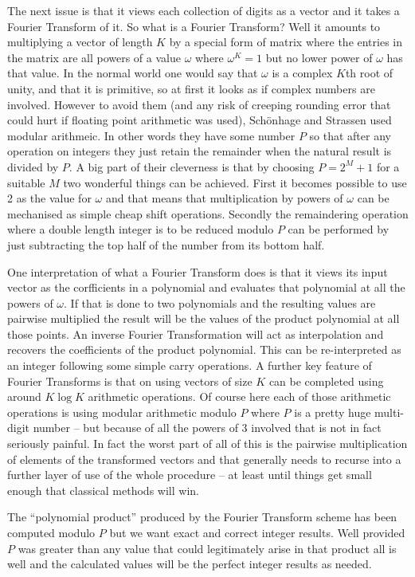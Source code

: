 The next issue is that it views each collection of digits as a vector
and it takes a Fourier Transform of it. So what is a Fourier Transform?
Well it amounts to multiplying a vector of length $K$ by a special form
of matrix where the entries in the matrix are all powers of a value $\omega$
where $\omega^{K} = 1$ but no lower power of $\omega$ has that value. In
the normal world one would say that $\omega$ is a complex $K$th root of unity,
and that it is primitive, so at first it looks as if complex numbers are
involved. However to avoid them (and any risk of creeping rounding error
that could hurt if floating point arithmetic was used), Sch\"{o}nhage and
Strassen used modular arithmeic. In other words they have some number $P$
so that after any operation on integers they just retain the remainder
when the natural result is divided by $P$. A big part of their cleverness
is that by choosing $P = 2^{M}+1$ for a suitable $M$ two wonderful things
can be achieved. First it becomes possible to use 2 as the value for $\omega$
and that means that multiplication by powers of $\omega$ can be mechanised
as simple cheap shift operations. Secondly the remaindering operation
where a double length integer is to be reduced modulo $P$ can be performed
by just subtracting the top half of the number from its bottom half.

One interpretation of what a Fourier Transform does is that it views
its input vector as the corfficients in a polynomial and evaluates that
polynomial at all the powers of $\omega$. If that is done to two polynomials
and the resulting values are pairwise multiplied the result will be
the values of the product polynomial at all those points. An inverse
Fourier Transformation will act as interpolation and recovers the
coefficients of the product polynomial. This can be re-interpreted
as an integer following some simple carry operations. A further key
feature of Fourier Transforms is that on using vectors of size $K$ can
be completed using around $K \log K$ arithmetic operations. Of course
here each of those arithmetic operations is using modular arithmetic
modulo $P$ where $P$ is a pretty huge multi-digit number -- but because
of all the powers of 3 involved that is not in fact seriously painful. In
fact the worst part of all of this is the pairwise multiplication of elements
of the transformed vectors and that generally needs to recurse into a
further layer of use of the whole procedure -- at least until things get
small enough that classical methods will win.

The ``polynomial product'' produced by the Fourier Transform scheme has
been computed modulo $P$ but we want exact and correct integer results.
Well provided $P$ was greater than any value that could legitimately
arise in that product all is well and the calculated values will be
the perfect integer results as needed.


